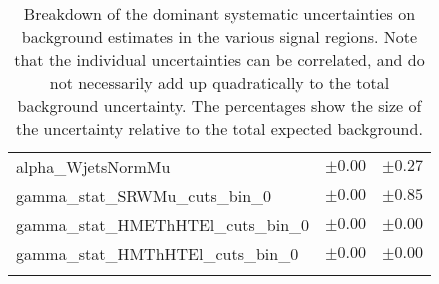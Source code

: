 \begin{table}
\begin{center}
\begin{tabular*}{\textwidth}{@{\extracolsep{\fill}}lcc}
alpha\_WjetsNormMu         & $\pm 0.00$          & $\pm 0.27$       \\
gamma\_stat\_SRWMu\_cuts\_bin\_0         & $\pm 0.00$          & $\pm 0.85$       \\
gamma\_stat\_HMEThHTEl\_cuts\_bin\_0         & $\pm 0.00$          & $\pm 0.00$       \\
gamma\_stat\_HMThHTEl\_cuts\_bin\_0         & $\pm 0.00$          & $\pm 0.00$       \\
\noalign{\smallskip}\hline\noalign{\smallskip}
\end{tabular*}
\end{center}
\caption[Breakdown of uncertainty on background estimates]{
Breakdown of the dominant systematic uncertainties on background estimates in the various signal regions.
Note that the individual uncertainties can be correlated, and do not necessarily add up quadratically to 
the total background uncertainty. The percentages show the size of the uncertainty relative to the total expected background.
\label{table.results.bkgestimate.uncertainties.SRWEl_SRWMu}}
\end{table}
%